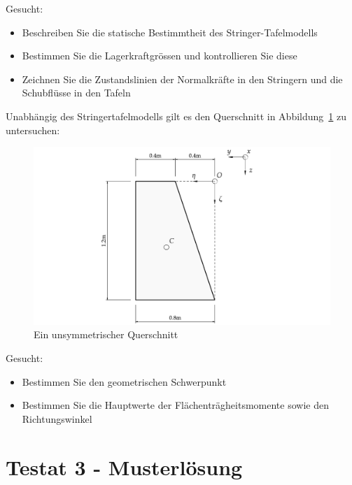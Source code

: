 \documentclass[
  12pt,
  letterpaper,
  DIV=11,
  egregdoesnotlikesansseriftitles]{scrartcl}
\providecommand{\tightlist}{%
  \setlength{\itemsep}{0pt}\setlength{\parskip}{0pt}}\usepackage{longtable,booktabs,array}
\begin{document}
Gesucht:

\begin{itemize}
\tightlist
\item
  Beschreiben Sie die statische Bestimmtheit des Stringer-Tafelmodells
\item
  Bestimmen Sie die Lagerkraftgrössen und kontrollieren Sie diese
\item
  Zeichnen Sie die Zustandslinien der Normalkräfte in den Stringern und
  die Schubflüsse in den Tafeln
\end{itemize}

\newpage{}

Unabhängig des Stringertafelmodells gilt es den Querschnitt in
Abbildung~\ref{fig-qs} zu untersuchen:

\begin{figure}[H]

{\centering \includegraphics{BSI_HS23_Testat_03_files/mediabag/../images/Testat_03_HS23_QS.pdf}

}

\caption{\label{fig-qs}Ein unsymmetrischer Querschnitt}

\end{figure}

Gesucht:

\begin{itemize}
\tightlist
\item
  Bestimmen Sie den geometrischen Schwerpunkt
\item
  Bestimmen Sie die Hauptwerte der Flächenträgheitsmomente sowie den
  Richtungswinkel
\end{itemize}

\newpage{}

\hypertarget{testat-3---musterluxf6sung}{%
\section{Testat 3 - Musterlösung}\label{testat-3---musterluxf6sung}}
\end{document}
